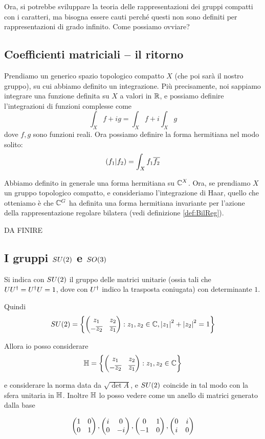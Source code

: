 	Ora, si potrebbe sviluppare la teoria delle rappresentazioni dei gruppi compatti con i caratteri, ma bisogna essere cauti perché questi non sono definiti per rappresentazioni di grado infinito. Come possiamo ovviare?
	
	\subsection{Coefficienti matriciali -- il ritorno}
		Prendiamo un generico spazio topologico compatto $X$ (che poi sarà il nostro gruppo), su cui abbiamo definito un integrazione. Più precisamente, noi sappiamo integrare una funzione definita su $X$ a valori in $\mathbb R$, e possiamo definire l'integrazioni di funzioni complesse come
		\[
		 \int_X f+ig = \int_X f +i\int_X g
		\]
		dove $f,g$ sono funzioni reali. Ora possiamo definire la forma hermitiana nel modo solito:
		\[
			\left(f_1 | f_2\right) = \int_X f_1 \overline{f_2}  
		\]
		
		Abbiamo definito in generale una forma hermitiana su $\mathbb C^{X}$. Ora, se prendiamo $X$ un gruppo topologico compatto, e consideriamo l'integrazione di Haar, quello che otteniamo è che $\mathbb C^{G}$ ha definita una forma hermitiana invariante per l'azione della rappresentazione regolare bilatera (vedi definizione \ref{def:BilReg}).
		
		DA FINIRE
		
	\subsection{I gruppi $SU(2)$ e $SO(3)$}
		Si indica con $SU(2)$ il gruppo delle matrici unitarie (ossia tali che $UU^\dagger=U^\dagger U=1$, dove con $U^\dagger$ indico la trasposta coniugata) con determinante $1$.
		
		Quindi 
		\[
			SU(2) = \left\{
				\left( \begin{matrix} z_1 & z_2 \\ -\overline{z_2} & \overline{z_1} \end{matrix} \right) :z_1,z_2 \in \mathbb C, \left|z_1\right|^2+\left|z_2\right|^2=1
			\right\}
		\]
		
		Allora io posso considerare
		\[
			\mathbb H = \left\{
				\left( \begin{matrix} z_1 & z_2 \\ -\overline{z_2} & \overline{z_1} \end{matrix} \right) :z_1,z_2 \in \mathbb C	
			\right\}
		\]
		
		e considerare la norma data da $\sqrt{\det A}$, e $SU(2)$ coincide in tal modo con la sfera unitaria in $\mathbb H$. Inoltre $\mathbb H$ lo posso vedere come un anello di matrici generato dalla base
		
		\[
			\left( \begin{matrix} 1 & 0 \\ 0 & 1 \end{matrix} \right), \left( \begin{matrix} i & 0 \\ 0 & -i \end{matrix} \right), \left( \begin{matrix} 0 & 1 \\ -1 & 0 \end{matrix} \right), \left( \begin{matrix} 0 & i \\ i & 0 \end{matrix} \right)
		\]
		
